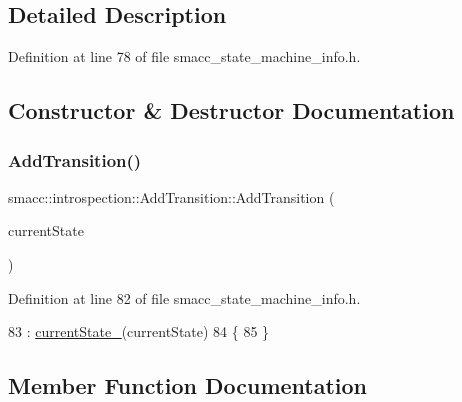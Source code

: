 \subsection{Detailed Description}


Definition at line 78 of file smacc\+\_\+state\+\_\+machine\+\_\+info.\+h.



\subsection{Constructor \& Destructor Documentation}
\mbox{\label{structsmacc_1_1introspection_1_1AddTransition_a7bec012404747e4ab3eb6ca32cf06ba7}} 
\subsubsection{\texorpdfstring{Add\+Transition()}{AddTransition()}}
{\footnotesize\ttfamily smacc\+::introspection\+::\+Add\+Transition\+::\+Add\+Transition (\begin{DoxyParamCaption}\item[{std\+::shared\+\_\+ptr$<$ \hyperlink{classsmacc_1_1introspection_1_1SmaccStateInfo}{Smacc\+State\+Info} $>$ \&}]{current\+State }\end{DoxyParamCaption})\hspace{0.3cm}{\ttfamily [inline]}}



Definition at line 82 of file smacc\+\_\+state\+\_\+machine\+\_\+info.\+h.


\begin{DoxyCode}
83         : \hyperlink{structsmacc_1_1introspection_1_1AddTransition_a56fd9b1bdf6761bbe5258dc915481f4b}{currentState\_}(currentState)
84     \{
85     \}
\end{DoxyCode}


\subsection{Member Function Documentation}
\mbox{\label{structsmacc_1_1introspection_1_1AddTransition_a40896e3e99a230be221d1a9733cb5e50}} 

